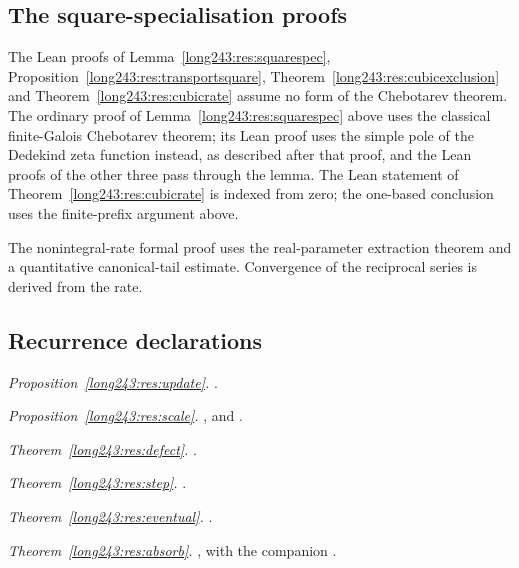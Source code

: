 \documentclass[11pt]{article}
\begin{document}
\subsection*{The square-specialisation proofs}
The Lean proofs of Lemma~\ref{long243:res:squarespec},
Proposition~\ref{long243:res:transportsquare},
Theorem~\ref{long243:res:cubicexclusion} and
Theorem~\ref{long243:res:cubicrate} assume no form of the Chebotarev
theorem. The ordinary proof of Lemma~\ref{long243:res:squarespec} above
uses the classical finite-Galois Chebotarev theorem; its Lean proof uses
the simple pole of the Dedekind zeta function instead, as described after
that proof, and the Lean proofs of the other three pass through the
lemma. The Lean statement
of Theorem~\ref{long243:res:cubicrate} is indexed from zero; the
one-based conclusion uses the finite-prefix argument above.

The nonintegral-rate formal proof uses the real-parameter extraction
theorem and a quantitative canonical-tail estimate. Convergence of the
reciprocal series is derived from the rate.

\subsection*{Recurrence declarations}
\noindent\emph{Proposition~\ref{long243:res:update}.} .

\noindent\emph{Proposition~\ref{long243:res:scale}.} ,
and
.

\noindent\emph{Theorem~\ref{long243:res:defect}.} .

\noindent\emph{Theorem~\ref{long243:res:step}.} .

\noindent\emph{Theorem~\ref{long243:res:eventual}.} .

\noindent\emph{Theorem~\ref{long243:res:absorb}.} , with the companion
.
\end{document}
